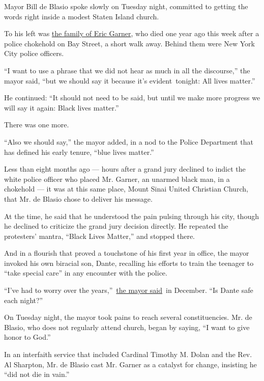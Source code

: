 Mayor Bill de Blasio spoke slowly on Tuesday night, committed to getting
the words right inside a modest Staten Island church.

To his left was
\href{http://www.nytimes3xbfgragh.onion/2015/07/15/nyregion/eric-garners-family-says-settlement-will-not-stall-push-for-police-reform.html}{the
family of Eric Garner}, who died one year ago this week after a police
chokehold on Bay Street, a short walk away. Behind them were New York
City police officers.

``I want to use a phrase that we did not hear as much in all the
discourse,'' the mayor said, ``but we should say it because it's
evident~tonight: All lives matter.''

He continued: ``It should not need to be said, but until we make more
progress we will say it again: Black lives matter.''

There was one more.

``Also we should say,'' the mayor added, in a nod to the Police
Department that has defined his early tenure, ``blue lives matter.''

Less than eight months ago --- hours after a grand jury declined to
indict the white police officer who placed Mr. Garner, an unarmed black
man, in a chokehold --- it was at this same place, Mount Sinai United
Christian Church, that Mr. de Blasio chose to deliver his message.

At the time, he said that he understood the pain pulsing through his
city, though he declined to criticize the grand jury decision directly.
He repeated the protesters' mantra, ``Black Lives Matter,'' and stopped
there.

And in a flourish that proved a touchstone of his first year in office,
the mayor invoked his own biracial son, Dante, recalling his efforts to
train the teenager to ``take special care'' in any encounter with the
police.

``I've had to worry over the
years,''~\href{http://www.nytimes3xbfgragh.onion/aponline/2014/12/04/us/ap-us-police-chokehold-death-mayor.html}{the
mayor said}~in December. ``Is Dante safe each night?''

On Tuesday night, the mayor took pains to reach several constituencies.
Mr. de Blasio, who does not regularly attend church, began by saying,
``I want to give honor to God.''

In an interfaith service that included Cardinal Timothy M. Dolan and the
Rev. Al Sharpton, Mr. de Blasio cast Mr. Garner as a catalyst for
change, insisting he ``did not die in vain.''

